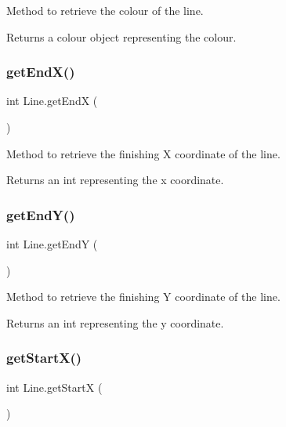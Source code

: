 Method to retrieve the colour of the line. 

\begin{DoxyReturn}{Returns}
a colour object representing the colour. 
\end{DoxyReturn}
\mbox{\label{class_line_a7a5d82d47496f42297c77dc359d45e75}} 
\subsubsection{\texorpdfstring{get\+End\+X()}{getEndX()}}
{\footnotesize\ttfamily int Line.\+get\+EndX (\begin{DoxyParamCaption}{ }\end{DoxyParamCaption})}



Method to retrieve the finishing X coordinate of the line. 

\begin{DoxyReturn}{Returns}
an int representing the x coordinate. 
\end{DoxyReturn}
\mbox{\label{class_line_add8c48f0c1ee6de19e50dc463502a8ca}} 
\subsubsection{\texorpdfstring{get\+End\+Y()}{getEndY()}}
{\footnotesize\ttfamily int Line.\+get\+EndY (\begin{DoxyParamCaption}{ }\end{DoxyParamCaption})}



Method to retrieve the finishing Y coordinate of the line. 

\begin{DoxyReturn}{Returns}
an int representing the y coordinate. 
\end{DoxyReturn}
\mbox{\label{class_line_a1a555bf02c6b9f7df22558f0717aa651}} 
\subsubsection{\texorpdfstring{get\+Start\+X()}{getStartX()}}
{\footnotesize\ttfamily int Line.\+get\+StartX (\begin{DoxyParamCaption}{ }\end{DoxyParamCaption})}



